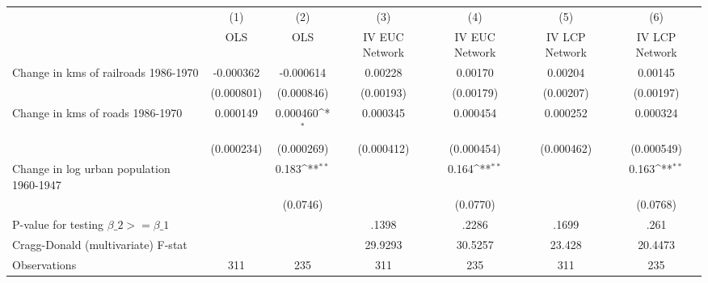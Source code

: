 {
\def\sym#1{\ifmmode^{#1}\else\(^{#1}\)\fi}
\begin{tabular}{l*{6}{c}}
\hline\hline
                &\multicolumn{1}{c}{(1)}&\multicolumn{1}{c}{(2)}&\multicolumn{1}{c}{(3)}&\multicolumn{1}{c}{(4)}&\multicolumn{1}{c}{(5)}&\multicolumn{1}{c}{(6)}\\
                &\multicolumn{1}{c}{OLS}&\multicolumn{1}{c}{OLS}&\multicolumn{1}{c}{IV EUC Network}&\multicolumn{1}{c}{IV EUC Network}&\multicolumn{1}{c}{IV LCP Network}&\multicolumn{1}{c}{IV LCP Network}\\
\hline
Change in kms of railroads 1986-1970&-0.000362         &-0.000614         &  0.00228         &  0.00170         &  0.00204         &  0.00145         \\
                &(0.000801)         &(0.000846)         &(0.00193)         &(0.00179)         &(0.00207)         &(0.00197)         \\
[1em]
Change in kms of roads 1986-1970& 0.000149         & 0.000460\sym{*}  & 0.000345         & 0.000454         & 0.000252         & 0.000324         \\
                &(0.000234)         &(0.000269)         &(0.000412)         &(0.000454)         &(0.000462)         &(0.000549)         \\
[1em]
Change in log urban population 1960-1947&                  &    0.183\sym{**} &                  &    0.164\sym{**} &                  &    0.163\sym{**} \\
                &                  & (0.0746)         &                  & (0.0770)         &                  & (0.0768)         \\
\hline
P-value for testing $\beta\_{2} >= \beta\_{1}$&                  &                  &    .1398         &    .2286         &    .1699         &     .261         \\
Cragg-Donald (multivariate) F-stat&                  &                  &  29.9293         &  30.5257         &   23.428         &  20.4473         \\
Observations    &      311         &      235         &      311         &      235         &      311         &      235         \\
\hline\hline
\end{tabular}
}
